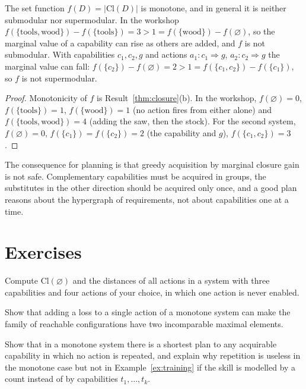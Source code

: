 \begin{newresult}\label{prop:complement}
The set function $f(D)=|\mathrm{Cl}(D)|$ is monotone, and in general it is neither submodular nor supermodular. In the workshop $f(\{\mathrm{tools,wood}\})-f(\{\mathrm{tools}\})=3>1=f(\{\mathrm{wood}\})-f(\varnothing)$, so the marginal value of a capability can rise as others are added, and $f$ is not submodular. With capabilities $c_1,c_2,g$ and actions $a_1:c_1\Rightarrow g$, $a_2:c_2\Rightarrow g$ the marginal value can fall: $f(\{c_2\})-f(\varnothing)=2>1=f(\{c_1,c_2\})-f(\{c_1\})$, so $f$ is not supermodular.
\end{newresult}
\begin{proof}
Monotonicity of $f$ is Result~\ref{thm:closure}(b). In the workshop, $f(\varnothing)=0$, $f(\{\mathrm{tools}\})=1$, $f(\{\mathrm{wood}\})=1$ (no action fires from either alone) and $f(\{\mathrm{tools,wood}\})=4$ (adding the saw, then the stock). For the second system, $f(\varnothing)=0$, $f(\{c_1\})=f(\{c_2\})=2$ (the capability and $g$), $f(\{c_1,c_2\})=3$.
\end{proof}

The consequence for planning is that greedy acquisition by marginal closure gain is not safe. Complementary capabilities must be acquired in groups, the substitutes in the other direction should be acquired only once, and a good plan reasons about the hypergraph of requirements, not about capabilities one at a time.

\section*{Exercises}

\begin{exercise}
Compute $\mathrm{Cl}(\varnothing)$ and the distances of all actions in a system with three capabilities and four actions of your choice, in which one action is never enabled.
\end{exercise}

\begin{exercise}
Show that adding a loss to a single action of a monotone system can make the family of reachable configurations have two incomparable maximal elements.
\end{exercise}

\begin{exercise}
Show that in a monotone system there is a shortest plan to any acquirable capability in which no action is repeated, and explain why repetition is useless in the monotone case but not in Example~\ref{ex:training} if the skill is modelled by a count instead of by capabilities $t_1,\dots,t_k$.\label{ex2:no-repeat}
\end{exercise}

